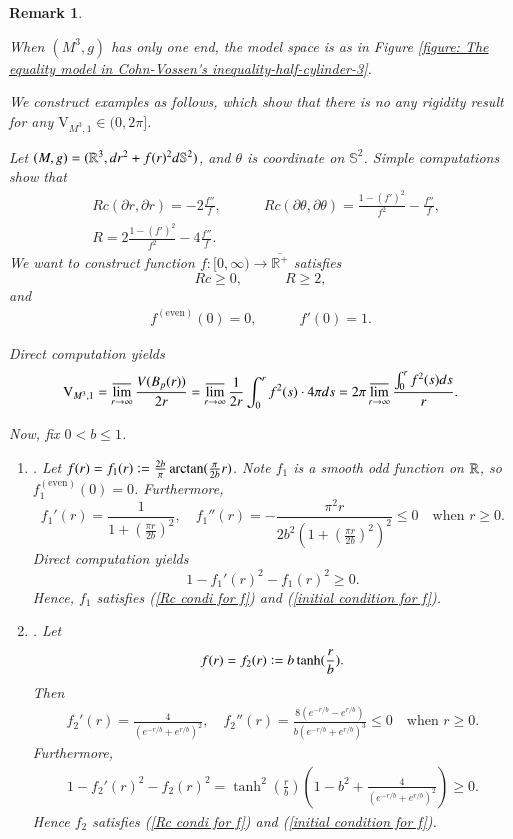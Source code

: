\documentclass[11pt]{amsart}
\newtheorem{remark}[theorem]{Remark}
\numberwithin{equation}{section}
\def\R{{\bf\mathbb R} }
\begin{document}
\begin{remark}\label{rem one end models}
{When $(M^3,g)$ has only one end, the model space is as in Figure \ref{figure: The equality model in Cohn-Vossen's inequality-half-cylinder-3}.  

We construct examples as follows, which show that there is no any rigidity result for any $\mathrm{V}_{M^3, 1}\in (0, 2\pi]$.

Let $(M, g)= (\R^3,  dr^2+ f(r)^2d\mathbb{S}^2)$, and $\theta$ is coordinate on $\mathbb{S}^2$.  Simple computations show that 
\begin{align*}
&Rc(\partial r, \partial r)= -2\frac{f''}{f}, \quad \quad \quad Rc(\partial\theta, \partial\theta)= \frac{1- (f')^2}{f^2}- \frac{f''}{f},\\
&R= 2\frac{1- (f')^2}{f^2}- 4\frac{f''}{f}. 
\end{align*}
We want to construct function $f: [0, \infty)\rightarrow \overline{\mathbb{R}^+}$ satisfies
\begin{equation}\label{Rc condi for f}
Rc\geq0,\quad\quad\quad R\geq2,\end{equation}
and
\begin{align}
f^{(\text{even})}(0)= 0, \quad \quad \quad f'(0)= 1.  \label{initial condition for f}
\end{align}

Direct computation yields
\begin{align}
\mathrm{V}_{M^3, 1}= \varlimsup_{r\rightarrow\infty}\frac{V(B_p(r))}{2r}= \varlimsup_{r\rightarrow\infty}\frac{1}{2r}\int_0^r f^2(s)\cdot 4\pi ds= 2\pi\varlimsup_{r\rightarrow\infty}\frac{\int_0^r f^2(s)ds}{r}. \nonumber 
\end{align}

Now, fix $0<b\leq 1$. 

\begin{enumerate}
\item[Example $(1)$].  Let 
$ f(r)=f_1(r)\vcentcolon=\frac{2b}{\pi}\arctan(\frac{\pi}{2b}r)$. Note $f_1$ is a smooth odd function on $\R$, so $f_1^{(\text{even})}(0)= 0$. Furthermore,
$$  f_1'(r)=\frac{1}{1+(\frac{\pi r}{2b})^2},\quad f_1''(r)=-\frac{\pi^2 r}{2b^2(1+(\frac{\pi r}{2b})^2)^2}\leq 0 \quad \text{when } r\geq 0.$$
Direct computation yields 
$$1-f_1'(r)^2-f_1(r)^2\geq 0.$$ Hence, $f_1$ satisfies (\ref{Rc condi for f}) and (\ref{initial condition for f}).
\item[Example $(2)$].   Let 
$$f(r)=f_2(r)\vcentcolon =b\tanh(\frac{r}{b}).$$  
Then
\begin{align*}
    f_2'(r)=\frac{4}{\left(e^{-r/b}+e^{r/b}\right)^2},\quad f_2''(r)=\frac{8 \left(e^{-r/b}-e^{r/b}\right)}{b \left(e^{-r/b}+e^{r/b}\right)^3}\leq 0\quad \text{when } r\geq 0.
\end{align*}
Furthermore,
\begin{align*}
    1-f_2'(r)^2-f_2(r)^2=\tanh^2(\frac{r}{b})\left(1-b^2+\frac{4}{\left(e^{-r/b}+e^{r/b}\right)^2}\right)\geq 0.
\end{align*}
Hence $f_2$ satisfies (\ref{Rc condi for f}) and (\ref{initial condition for f}).
\end{enumerate}

}
\end{remark}
\end{document}
